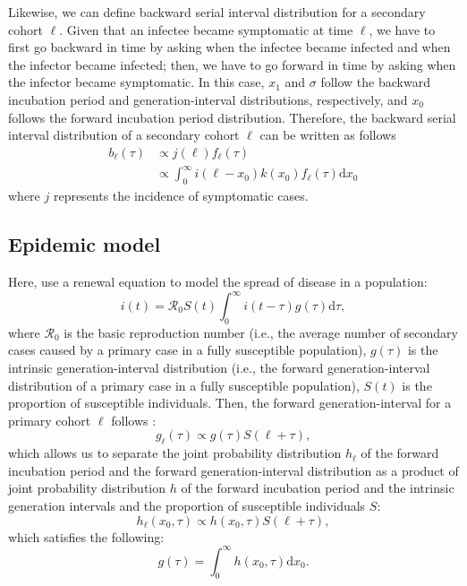 \documentclass[12pt]{article}
\begin{document}
Likewise, we can define backward serial interval distribution for a secondary cohort $\ell$.
Given that an infectee became symptomatic at time $\ell$, we have to first go backward in time by asking when the infectee became infected and when the infector became infected; 
then, we have to go forward in time by asking when the infector became symptomatic.
In this case, $x_1$ and $\sigma$ follow the backward incubation period and generation-interval distributions, respectively, and $x_0$ follows the forward incubation period distribution.
Therefore, the backward serial interval distribution of a secondary cohort $\ell$ can be written as follows
\begin{equation}
\begin{aligned}
b_\ell(\tau) &\propto j(\ell) f_{\ell}(\tau)\\
&\propto \int_0^\infty i(\ell-x_0) k(x_0) f_{\ell}(\tau) \mathrm{d} x_0
\end{aligned}
\end{equation}
where $j$ represents the incidence of symptomatic cases.

\subsection{Epidemic model}

Here, use a renewal equation to model the spread of disease in a population:
\begin{equation}
i(t) = \mathcal R_0 S(t) \int_0^\infty i(t-\tau) g(\tau) \mathrm{d}\tau,
\end{equation}
where $\mathcal R_0$ is the basic reproduction number (i.e., the average number of secondary cases caused by a primary case  in a fully susceptible population), $g(\tau)$ is the intrinsic generation-interval distribution (i.e., the forward generation-interval distribution of a primary case in a fully susceptible population), $S(t)$ is the proportion of susceptible individuals.
Then, the forward generation-interval for a primary cohort $\ell$ follows \citep{champredon2015intrinsic}:
\begin{equation}
g_\ell (\tau) \propto g(\tau) S(\ell + \tau),
\end{equation}
which allows us to separate the joint probability distribution $h_\ell$ of the forward incubation period and the forward generation-interval distribution as a product of joint probability distribution $h$ of the forward incubation period and the intrinsic generation intervals and the proportion of susceptible individuals $S$:
\begin{equation}
h_\ell (x_0, \tau) \propto h(x_0, \tau) S(\ell + \tau),
\end{equation}
which satisfies the following:
\begin{equation}
g(\tau) = \int_0^\infty h(x_0, \tau) \mathrm{d}x_0.
\end{equation}
\end{document}
